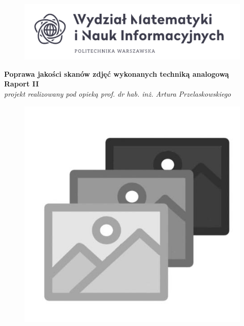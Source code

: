 \documentclass[]{mwart}
\begin{document}
\thispagestyle{empty}

\begin{figure}[h]
    \centering
    \includegraphics[width=1\textwidth]{logo_uczelni.png}
\end{figure}


\begin{center}
    {\LARGE \textbf{Poprawa jakości skanów zdjęć wykonanych techniką analogową
        }} \\[0.3cm]
    {\large \textbf{Raport II}} \\[0.2cm]
    \textit{projekt realizowany pod opieką prof. dr hab. inż. Artura Przelaskowskiego}

\end{center}

\begin{figure}[h]
    \centering
    \includegraphics[width=1\textwidth]{logo_projektu.png}
\end{figure}
\end{document}
